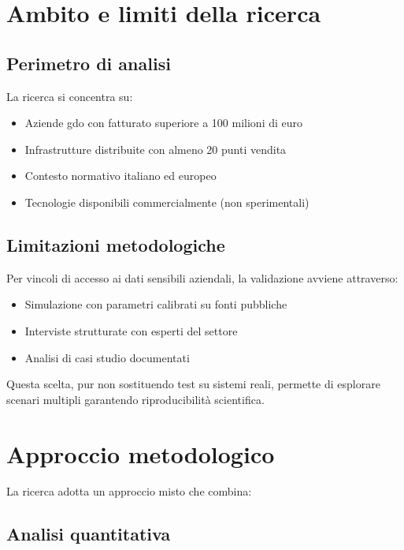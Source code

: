 \section{Ambito e limiti della ricerca}
\label{sec:ambito_limiti}

\subsection{Perimetro di analisi}
\label{subsec:perimetro}

La ricerca si concentra su:
\begin{itemize}
\item Aziende \gls{gdo} con fatturato superiore a 100 milioni di euro
\item Infrastrutture distribuite con almeno 20 punti vendita
\item Contesto normativo italiano ed europeo
\item Tecnologie disponibili commercialmente (non sperimentali)
\end{itemize}

\subsection{Limitazioni metodologiche}
\label{subsec:limitazioni}

Per vincoli di accesso ai dati sensibili aziendali, la validazione avviene attraverso:
\begin{itemize}
\item Simulazione con parametri calibrati su fonti pubbliche
\item Interviste strutturate con esperti del settore
\item Analisi di casi studio documentati
\end{itemize}

Questa scelta, pur non sostituendo test su sistemi reali, permette di esplorare scenari multipli garantendo riproducibilità scientifica.

\section{Approccio metodologico}
\label{sec:approccio_metodologico}

La ricerca adotta un approccio misto che combina:

\subsection{Analisi quantitativa}
\label{subsec:analisi_quantitativa}


